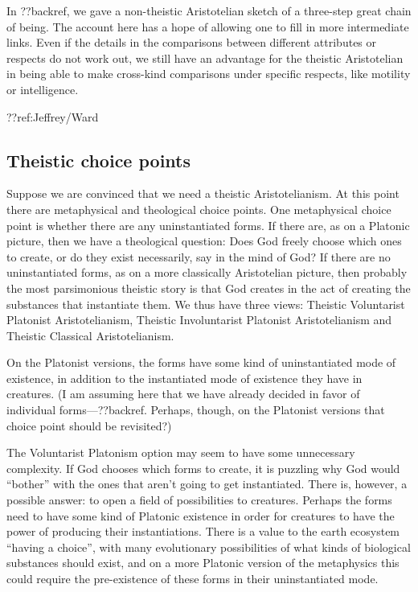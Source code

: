 In ??backref, we gave a non-theistic Aristotelian sketch of a three-step great chain of being. The account here has
a hope of allowing one to fill in more intermediate links.
Even if the details in the comparisons between different attributes or respects do not work out, we still have an advantage 
for the theistic Aristotelian in being able to make cross-kind comparisons under specific respects, like motility or intelligence.

??ref:Jeffrey/Ward

\subsection{Theistic choice points}
Suppose we are convinced that we need a theistic Aristotelianism.
At this point there are metaphysical and theological choice points. One metaphysical choice point is whether there are any
uninstantiated forms. If there are, as on a Platonic picture, then we have a theological question: Does God freely choose which ones
to create, or do they exist necessarily, say in the mind of God? If there are no uninstantiated forms, as on a more classically 
Aristotelian picture, then probably the most parsimonious theistic story is that God creates in the act of creating the substances 
that instantiate them. We thus have three views: Theistic Voluntarist Platonist Aristotelianism, Theistic Involuntarist Platonist Aristotelianism
and Theistic Classical Aristotelianism.

On the Platonist versions, the forms have some kind of uninstantiated mode of existence, in addition to the instantiated mode of 
existence they have in creatures. (I am assuming here that we have already decided in favor of individual forms---??backref. Perhaps,
though, on the Platonist versions that choice point should be revisited?)

The Voluntarist Platonism option may seem to have some unnecessary complexity. If God chooses which forms to create, it is 
puzzling why God would ``bother'' with the ones that aren't going to get instantiated. There is, however, a possible answer:
to open a field of possibilities to creatures. Perhaps the forms need to have some kind of Platonic existence in order for
creatures to have the power of producing their instantiations. There is a value to the earth ecosystem ``having a choice'', with
many evolutionary possibilities of what kinds of biological substances should exist, and on a more Platonic version of the 
metaphysics this could require the pre-existence of these forms in their uninstantiated mode. 

